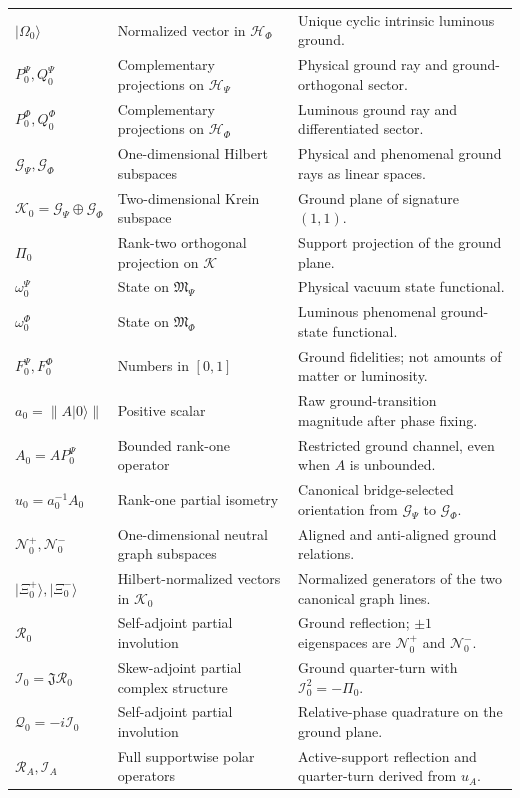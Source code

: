 \documentclass[11pt,reqno]{scrartcl}
\newcommand{\scrK}{\mathscr K}
\newcommand{\scrHP}{\mathscr H_{\Psi}}
\newcommand{\scrHF}{\mathscr H_{\Phi}}
\newcommand{\algP}{\mathfrak M_{\Psi}}
\newcommand{\algF}{\mathfrak M_{\Phi}}
\newcommand{\omegaP}{\omega_{0}^{\Psi}}
\newcommand{\omegaF}{\omega_{0}^{\Phi}}
\newcommand{\fundJ}{\mathfrak J}
\newcommand{\PzeroP}{P_{0}^{\Psi}}
\newcommand{\QzeroP}{Q_{0}^{\Psi}}
\newcommand{\PzeroF}{P_{0}^{\Phi}}
\newcommand{\QzeroF}{Q_{0}^{\Phi}}
\newcommand{\GzeroP}{\mathscr G_{\Psi}}
\newcommand{\GzeroF}{\mathscr G_{\Phi}}
\newcommand{\Kzero}{\mathscr K_{0}}
\newcommand{\Pizero}{\Pi_{0}}
\newcommand{\Azero}{A_{0}}
\newcommand{\uzero}{u_{0}}
\newcommand{\Rzero}{\mathcal R_{0}}
\newcommand{\Izero}{\mathcal I_{0}}
\newcommand{\Qzero}{\mathcal Q_{0}}
\newcommand{\RA}{\mathcal R_{A}}
\newcommand{\IA}{\mathcal I_{A}}
\newcommand{\NzeroPlus}{\mathscr N_{0}^{+}}
\newcommand{\NzeroMinus}{\mathscr N_{0}^{-}}
\newcommand{\ket}[1]{\lvert #1\rangle}
\theoremstyle{plain}
\theoremstyle{definition}
\theoremstyle{remark}
\begin{document}
\begin{longtable}{>{\raggedright\arraybackslash}p{}
>{\raggedright\arraybackslash}p{}
>{\raggedright\arraybackslash}p{}}
$\ket{\Omega_0}$ & Normalized vector in $\scrHF$ & Unique cyclic intrinsic luminous ground. \\
$\PzeroP,\QzeroP$ & Complementary projections on $\scrHP$ & Physical ground ray and ground-orthogonal sector. \\
$\PzeroF,\QzeroF$ & Complementary projections on $\scrHF$ & Luminous ground ray and differentiated sector. \\
$\GzeroP,\GzeroF$ & One-dimensional Hilbert subspaces & Physical and phenomenal ground rays as linear spaces. \\
$\Kzero=\GzeroP\oplus\GzeroF$ & Two-dimensional Krein subspace & Ground plane of signature $(1,1)$. \\
$\Pizero$ & Rank-two orthogonal projection on $\scrK$ & Support projection of the ground plane. \\
$\omegaP$ & State on $\algP$ & Physical vacuum state functional. \\
$\omegaF$ & State on $\algF$ & Luminous phenomenal ground-state functional. \\
$F_0^{\Psi},F_0^{\Phi}$ & Numbers in $[0,1]$ & Ground fidelities; not amounts of matter or luminosity. \\
$a_0=\|A\ket0\|$ & Positive scalar & Raw ground-transition magnitude after phase fixing. \\
$\Azero=A\PzeroP$ & Bounded rank-one operator & Restricted ground channel, even when $A$ is unbounded. \\
$\uzero=a_0^{-1}\Azero$ & Rank-one partial isometry & Canonical bridge-selected orientation from $\GzeroP$ to $\GzeroF$. \\
$\NzeroPlus,\NzeroMinus$ & One-dimensional neutral graph subspaces & Aligned and anti-aligned ground relations. \\
$\ket{\Xi_0^+},\ket{\Xi_0^-}$ & Hilbert-normalized vectors in $\Kzero$ & Normalized generators of the two canonical graph lines. \\
$\Rzero$ & Self-adjoint partial involution & Ground reflection; $\pm1$ eigenspaces are $\NzeroPlus$ and $\NzeroMinus$. \\
$\Izero=\fundJ\Rzero$ & Skew-adjoint partial complex structure & Ground quarter-turn with $\Izero^2=-\Pizero$. \\
$\Qzero=-i\Izero$ & Self-adjoint partial involution & Relative-phase quadrature on the ground plane. \\
$\RA,\IA$ & Full supportwise polar operators & Active-support reflection and quarter-turn derived from $u_A$. \\

\end{longtable}
\end{document}
